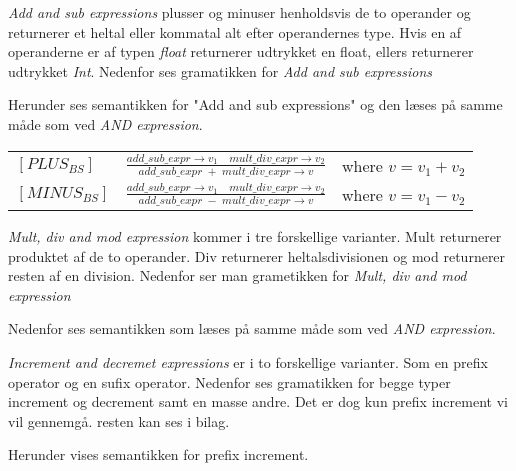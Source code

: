 \textit{Add and sub expressions} plusser og minuser henholdsvis de to operander og returnerer et heltal eller kommatal alt efter operandernes type. Hvis en af operanderne er af typen \textit{float} returnerer udtrykket en float, ellers returnerer udtrykket \textit{Int}. Nedenfor ses gramatikken for \textit{Add and sub expressions}

    
    \noindent Herunder ses semantikken for "Add and sub expressions" og den læses på samme måde som ved \textit{AND expression}.

\begin{semantik}
    \bgroup
    \def\arraystretch{3}
    \begin{table}[H]
    \centering
    \begin{tabular}{l c l}
        
        $[PLUS_{BS}]$ &$\frac{add\_sub\_expr \rightarrow v_1 \quad mult\_div\_expr \rightarrow v_2}{add\_sub\_expr\;+\;mult\_div\_expr \rightarrow v}$ & where $v = v_1 + v_2$ \\
        
        $[MINUS_{BS}]$ &$\frac{add\_sub\_expr \rightarrow v_1 \quad mult\_div\_expr \rightarrow v_2}{add\_sub\_expr\;-\;mult\_div\_expr \rightarrow v}$ & where $v = v_1 - v_2$ \\
        
    \end{tabular}
    \end{table}
    \egroup
    \caption{Add and sub expression}
    \label{sem:addSubExpr}
\end{semantik}

\textit{Mult, div and mod expression} kommer i tre forskellige varianter. Mult returnerer produktet af de to operander. Div returnerer heltalsdivisionen og mod returnerer resten af en division. Nedenfor ser man grametikken for \textit{Mult, div and mod expression}


Nedenfor ses semantikken som læses på samme måde som ved \textit{AND expression}.



\textit{Increment and decremet expressions} er i to forskellige varianter. Som en prefix operator og en sufix operator. Nedenfor ses gramatikken for begge typer increment og decrement samt en masse andre. Det er dog kun prefix increment vi vil gennemgå. resten kan ses i bilag.


Herunder vises semantikken for prefix increment.
